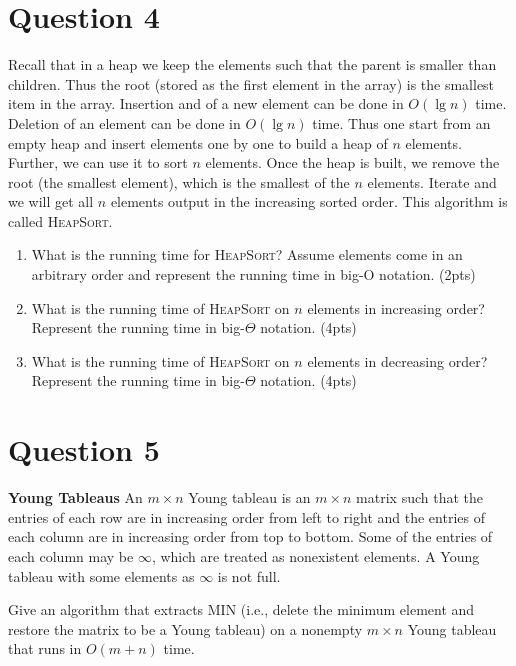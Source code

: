 \documentclass[11pt]{article}
\begin{document}
\section{Question 4} Recall that in a heap we keep the elements such that the parent is smaller than children. Thus the root (stored as the first element in the array) is the smallest item in the array. Insertion and of a new element can be done in $O(\lg n)$ time. Deletion of an element can be done in $O(\lg n)$ time. Thus one start from an empty heap and insert elements one by one to build a heap of $n$ elements. Further, we can use it to sort $n$ elements. Once the heap is built, we remove the root (the smallest element), which is the smallest of the $n$ elements. Iterate and we will get all $n$ elements output in the increasing sorted order.  This algorithm is called  \textsc{HeapSort}.
 
\begin{enumerate}
\item What is the running time for \textsc{HeapSort}? Assume elements come in an arbitrary order and represent the running time in big-O notation. (2pts)
\item What is the running time of \textsc{HeapSort} on $n$ elements in increasing order? Represent the running time in big-$\Theta$ notation. (4pts)
\item What is the running time of \textsc{HeapSort} on $n$ elements in decreasing order?  Represent the running time in big-$\Theta$ notation. (4pts)
\end{enumerate}

\section{Question 5} \textbf{Young Tableaus} An $m \times n$ Young tableau is an $m\times n$ matrix such that the entries of each row are in increasing order from left to right and the entries of each column are in increasing order from top to bottom. Some of the entries of each column may be $\infty$, which are treated as nonexistent elements. A Young tableau with some elements as $\infty$ is not full. 

Give an algorithm that extracts MIN (i.e., delete the minimum element and restore the matrix to be a Young tableau) on a nonempty $m\times n$ Young tableau that runs in $O(m+n)$ time. 
\end{document}
